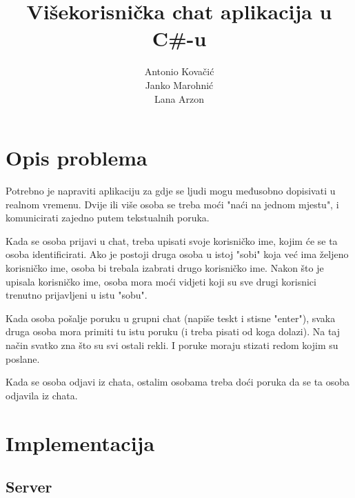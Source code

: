 \documentclass[10pt,a4paper,onecolumn,titlepage]{article}
\title{Višekorisnička chat aplikacija u C\#-u}
\author{Antonio Kovačić\\Janko Marohnić\\Lana Arzon}
\begin{document}
\maketitle

\tableofcontents

\newpage

\section{Opis problema}

Potrebno je napraviti aplikaciju za gdje se ljudi mogu međusobno dopisivati
u realnom vremenu. Dvije ili više osoba se treba moći "naći na jednom mjestu",
i komunicirati zajedno putem tekstualnih poruka.

Kada se osoba prijavi u chat, treba upisati svoje korisničko ime, kojim će se
ta osoba identificirati. Ako je postoji druga osoba u istoj "sobi" koja već
ima željeno korisničko ime, osoba bi trebala izabrati drugo korisničko ime.
Nakon što je upisala korisničko ime, osoba mora moći vidjeti koji su sve drugi
korisnici trenutno prijavljeni u istu "sobu".

Kada osoba pošalje poruku u grupni chat (napiše teskt i stisne "enter"), svaka
druga osoba mora primiti tu istu poruku (i treba pisati od koga dolazi). Na taj
način svatko zna što su svi ostali rekli. I poruke moraju stizati redom kojim
su poslane.

Kada se osoba odjavi iz chata, ostalim osobama treba doći poruka da se ta
osoba odjavila iz chata.

\section{Implementacija}

\subsection{Server}
\end{document}
